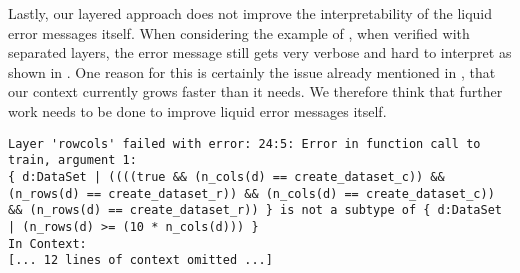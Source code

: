 Lastly, our layered approach does not improve the interpretability of the liquid error messages itself. When considering the example of , when verified with separated layers, the error message still gets very verbose and hard to interpret as shown in . One reason for this is certainly the issue already mentioned in , that our context currently grows faster than it needs. We therefore think that further work needs to be done to improve liquid error messages itself.

\begin{lstlisting}[caption={Error message for \Cref{lst:uc2_code3_fail}},label={lst:uc2_code3_error}]
Layer 'rowcols' failed with error: 24:5: Error in function call to train, argument 1:
{ d:DataSet | ((((true && (n_cols(d) == create_dataset_c)) && (n_rows(d) == create_dataset_r)) && (n_cols(d) == create_dataset_c)) && (n_rows(d) == create_dataset_r)) } is not a subtype of { d:DataSet | (n_rows(d) >= (10 * n_cols(d))) }
In Context:
[... 12 lines of context omitted ...]
\end{lstlisting}
